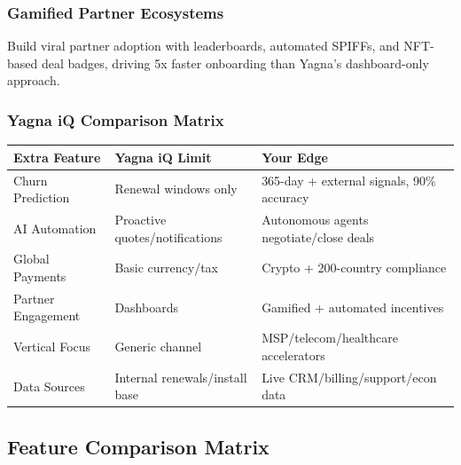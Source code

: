 \documentclass[12pt,a4paper]{article}
\begin{document}
\subsubsection{Gamified Partner Ecosystems}
Build viral partner adoption with leaderboards, automated SPIFFs, and NFT-based deal badges, driving 5x faster onboarding than Yagna's dashboard-only approach.

\subsubsection{Yagna iQ Comparison Matrix}
\begin{center}
\begin{tabularx}{\textwidth}{|p{3cm}|X|X|}
\hline
\textbf{Extra Feature} & \textbf{Yagna iQ Limit} & \textbf{Your Edge} \\
\hline
Churn Prediction & Renewal windows only & 365-day + external signals, 90\% accuracy \\
\hline
AI Automation & Proactive quotes/notifications & Autonomous agents negotiate/close deals \\
\hline
Global Payments & Basic currency/tax & Crypto + 200-country compliance \\
\hline
Partner Engagement & Dashboards & Gamified + automated incentives \\
\hline
Vertical Focus & Generic channel & MSP/telecom/healthcare accelerators \\
\hline
Data Sources & Internal renewals/install base & Live CRM/billing/support/econ data \\
\hline
\end{tabularx}
\end{center}

\subsection{Feature Comparison Matrix}

\footnotesize
\setlength{\tabcolsep}{2pt}
\renewcommand{\arraystretch}{1.2}
\end{document}
